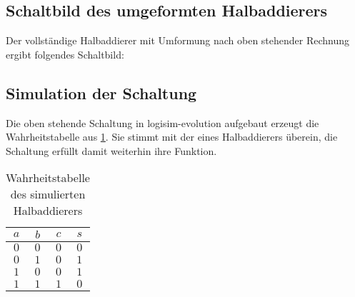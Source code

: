 \documentclass[
    paper=a4,
]{scrartcl}
\begin{document}
    \subsection{Schaltbild des umgeformten Halbaddierers}
        \label{subsec:1}
        Der vollständige Halbaddierer mit Umformung nach oben stehender Rechnung ergibt folgendes Schaltbild:
        \begin{center}
        \end{center}

    \subsection{Simulation der Schaltung}
       Die oben stehende Schaltung in logisim-evolution aufgebaut erzeugt die Wahrheitstabelle aus \ref{tab:1}. Sie stimmt mit der eines Halbaddierers überein, die Schaltung erfüllt damit weiterhin ihre Funktion.
        \begin{table}[ht]
            \centering
            \caption{Wahrheitstabelle des simulierten Halbaddierers}
            \label{tab:1}
            \begin{tabular}{cc|cc}\toprule
                $a$&$b$&$c$&$s$\\\midrule
                $0$&$0$&$0$&$0$\\
                $0$&$1$&$0$&$1$\\
                $1$&$0$&$0$&$1$\\
                $1$&$1$&$1$&$0$\\\bottomrule
                \end{tabular}
        \end{table}
\end{document}
